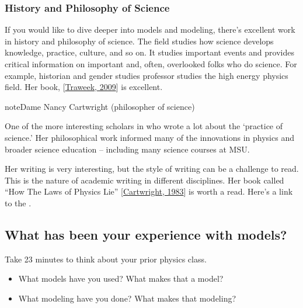 \documentclass[letterpaper,10pt,english]{jupyterBook}
\begin{document}
\subsubsection{History and Philosophy of Science}
\label{\detokenize{content/1_modeling/activity-what_is_a_model:history-and-philosophy-of-science}}
\sphinxAtStartPar
If you would like to dive deeper into models and modeling, there’s excellent work in history and philosophy of science. The field studies how science develops knowledge, practice, culture, and so on. It studies important events and provides critical information on important and, often, overlooked folks who do science. For example, historian and gender studies professor  studies the high energy physics field. Her book,  {[}\hyperlink{cite.content/X_additional_pages/references-page:id4}{Traweek, 2009}{]} is excellent.

\begin{sphinxadmonition}{note}{Dame Nancy Cartwright (philosopher of science)}

\sphinxAtStartPar
One of the more interesting scholars in  who wrote a lot about the ‘practice of science.’ Her philosophical work informed many of the innovations in physics and broader science education – including many science courses at MSU.

\sphinxAtStartPar
Her writing is very interesting, but the style of writing can be a challenge to read. This is the nature of academic writing in different disciplines. Her book called “How The Laws of Physics Lie” {[}\hyperlink{cite.content/X_additional_pages/references-page:id5}{Cartwright, 1983}{]} is worth a read. Here’s a link to the .
\end{sphinxadmonition}


\subsection{What has been your experience with models?}
\label{\detokenize{content/1_modeling/activity-what_is_a_model:what-has-been-your-experience-with-models}}
\sphinxAtStartPar
Take 2\sphinxhyphen{}3 minutes to think about your prior physics class.
\begin{itemize}
\item {} 
\sphinxAtStartPar
What models have you used? What makes that a model?

\item {} 
\sphinxAtStartPar
What modeling have you done? What makes that modeling?

\end{itemize}
\end{document}
